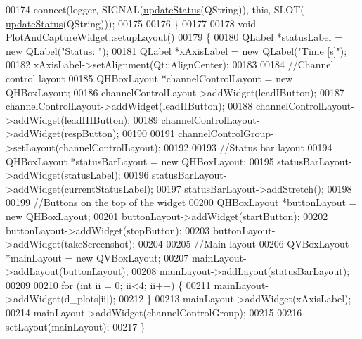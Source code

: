 \begin{DoxyCode}
00174      connect(logger, SIGNAL(\hyperlink{classPlotAndCaptureWidget_a769ecd243154ae9c4ecae9bd4fcbccdb}{updateStatus}(QString)), \textcolor{keyword}{this}, SLOT(
      \hyperlink{classPlotAndCaptureWidget_a769ecd243154ae9c4ecae9bd4fcbccdb}{updateStatus}(QString)));
00175 
00176 \}
00177 
00178 \textcolor{keywordtype}{void} PlotAndCaptureWidget::setupLayout()
00179 \{
00180     QLabel *statusLabel = \textcolor{keyword}{new} QLabel(\textcolor{stringliteral}{"Status: "});
00181     QLabel *xAxisLabel = \textcolor{keyword}{new} QLabel(\textcolor{stringliteral}{"Time [s]"});
00182     xAxisLabel->setAlignment(Qt::AlignCenter);
00183 
00184     \textcolor{comment}{//Channel control layout}
00185     QHBoxLayout *channelControlLayout = \textcolor{keyword}{new} QHBoxLayout;
00186     channelControlLayout->addWidget(leadIButton);
00187     channelControlLayout->addWidget(leadIIButton);
00188     channelControlLayout->addWidget(leadIIIButton);
00189     channelControlLayout->addWidget(respButton);
00190 
00191     channelControlGroup->setLayout(channelControlLayout);
00192 
00193     \textcolor{comment}{//Status bar layout}
00194     QHBoxLayout *statusBarLayout = \textcolor{keyword}{new} QHBoxLayout;
00195     statusBarLayout->addWidget(statusLabel);
00196     statusBarLayout->addWidget(currentStatusLabel);
00197     statusBarLayout->addStretch();
00198 
00199     \textcolor{comment}{//Buttons on the top of the widget}
00200     QHBoxLayout *buttonLayout = \textcolor{keyword}{new} QHBoxLayout;
00201     buttonLayout->addWidget(startButton);
00202     buttonLayout->addWidget(stopButton);
00203     buttonLayout->addWidget(takeScreenshot);
00204 
00205     \textcolor{comment}{//Main layout}
00206     QVBoxLayout *mainLayout = \textcolor{keyword}{new} QVBoxLayout;
00207     mainLayout->addLayout(buttonLayout);
00208     mainLayout->addLayout(statusBarLayout);
00209 
00210     \textcolor{keywordflow}{for} (\textcolor{keywordtype}{int} ii = 0; ii<4; ii++) \{
00211         mainLayout->addWidget(d\_plots[ii]);
00212     \}
00213     mainLayout->addWidget(xAxisLabel);
00214     mainLayout->addWidget(channelControlGroup);
00215 
00216     setLayout(mainLayout);
00217 \}
\end{DoxyCode}

